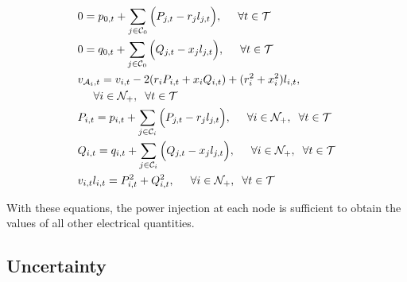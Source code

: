 $$
\begin{aligned}
& 0  =  p_{0,t} + \sum_{j\in \mathcal{C}_0} \Big(P_{j,t}-r_{j}l_{j,t} \Big), \hspace{0.5cm} \forall{t} \in \mathcal{T} \label{ACOPF1}\\
& 0   =  q_{0,t} + \sum_{j\in \mathcal{C}_0} \Big( Q_{j,t}-x_{j}l_{j,t} \Big), \hspace{0.5cm} \forall{t} \in \mathcal{T} \label{ACOPF2}\\
& v_{\mathcal{A}_i,t}  =   v_{i,t} -2(r_iP_{i,t} + x_iQ_{i,t}) + (r_i^2 + x_i^2)l_{i,t}, \\
& \hspace{0.5cm} \forall i \in \mathcal{N}_{+}, \hspace{0.2cm} \forall{t} \in \mathcal{T} \label{ACOPF3}\\
& P_{i,t} =  p_{i,t} + \sum_{j\in \mathcal{C}_i} \Big( P_{j,t}-r_{j}l_{j,t} \Big), \hspace{0.5cm} \forall i \in \mathcal{N}_{+}, \hspace{0.2cm} \forall{t} \in \mathcal{T} \label{ACOPF4}\\
& Q_{i,t}  =  q_{i,t} + \sum_{j\in \mathcal{C}_i} \Big( Q_{j,t}-x_{j}l_{j,t} \Big), \hspace{0.5cm} \forall i \in \mathcal{N}_{+}, \hspace{0.2cm} \forall{t} \in \mathcal{T} \label{ACOPF5}\\
& v_{i,t}l_{i,t} = P_{i,t}^2 + Q_{i,t}^2, \hspace{0.5cm} \forall i \in \mathcal{N}_{+}, \hspace{0.2cm} \forall{t} \in \mathcal{T} \label{ACOPF:quad} \\
\end{aligned}
$$

With these equations, the power injection at each node is sufficient to obtain the values of all other electrical quantities.

\subsection{Uncertainty}


